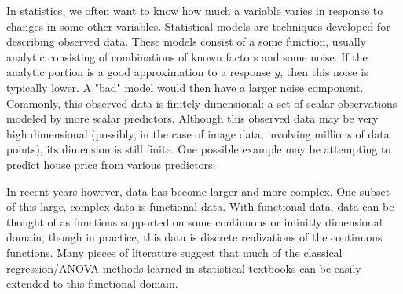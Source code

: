 In statistics, we often want to know how much a variable varies in response to changes in some other variables. Statistical models are techniques developed for describing observed data.  These models consist of a some function, usually analytic consisting of combinations of known factors and some noise.  If the analytic portion is a good approximation to a response \(y\), then this noise is typically lower.  A "bad" model would then have a larger noise component.  Commonly, this observed data is finitely-dimensional: a set of scalar observations modeled by more scalar predictors.  Although this observed data may be very high dimensional (possibly, in the case of image data, involving millions of data points), its dimension is still finite.  One possible example may be attempting to predict house price from various predictors\cite{de_cock_ames_2011}.

In recent years however, data has become larger and more complex.  One subset of this large, complex data is functional data.  With functional data, data can be thought of as functions supported on some continuous or infinitly dimensional domain, though in practice, this data is discrete realizations of the continuous functions.   Many pieces of literature suggest that much of the classical regression/ANOVA methods learned in statistical textbooks can be easily extended to this functional domain.